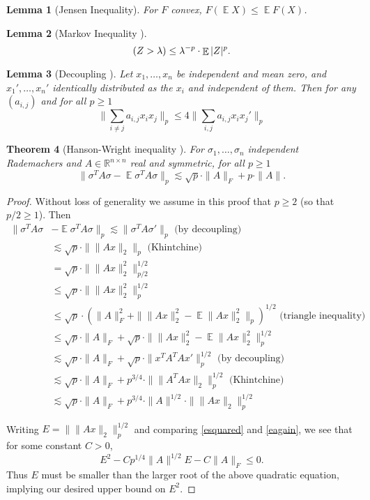 \documentclass[11pt]{article}
\DeclareMathOperator*{\E}{\mathbb{E}}
\let\Pr\relax
\DeclareMathOperator*{\Pr}{\mathbb{P}}
\newcommand{\R}{\mathbb{R}}
\newtheorem{theorem}{Theorem}
\newtheorem{lemma}[theorem]{Lemma}
\begin{document}
\begin{lemma}[Jensen Inequality]
For $F$ convex, $F(\E X) \le \E F(X)$.
\end{lemma}



\begin{lemma}[Markov Inequality ]
$$
\Pr(Z > \lambda) \le \lambda^{-p} \cdot \E|Z|^p.
$$
\end{lemma}



\begin{lemma}[Decoupling {\cite{de2012decoupling}}]
Let $x_1,\ldots,x_n$ be independent and mean zero, and $x_1',\ldots,x_n'$ identically distributed as the $x_i$ and independent of them. Then for any $(a_{i,j})$ and for all $p\ge 1$
$$
\|\sum_{i\neq j} a_{i,j} x_i x_j\|_p \le 4 \|\sum_{i,j} a_{i ,j} x_i x_j'\|_p
$$
\end{lemma}


\begin{theorem}[Hanson-Wright inequality ]\label{hw}
For $\sigma_1,\ldots,\sigma_n$ independent Rademachers and $A\in\R^{n\times n}$ real and symmetric, for all $p\ge 1$
$$
\|\sigma^T A \sigma - \E \sigma^T A \sigma\|_p \lesssim \sqrt{p} \cdot \|A\|_F + p\cdot \|A\| .
$$
\end{theorem}
\begin{proof}
Without loss of generality we assume in this proof that $p\ge 2$ (so that $p/2 \ge 1$). Then
\begin{align}
\|\sigma^T A \sigma &- \E \sigma^T A \sigma\|_p \lesssim \|\sigma^T A \sigma'\|_p\text{ (by decoupling)} \label{hwstart}\\
{}&\lesssim \sqrt{p} \cdot \| \|Ax\|_2 \|_p \text{ (Khintchine)} \label{esquared}\\
{}& = \sqrt{p} \cdot \| \|Ax\|_2^2 \|_{p/2}^{1/2} \label{induction}\\
\nonumber {}& \le \sqrt{p} \cdot \| \|Ax\|_2^2 \|_p^{1/2} \\
\nonumber {}& \le \sqrt{p} \cdot (\|A\|_F^2 + \|\|Ax\|_2^2 - \E \|Ax\|_2^2 \|_p)^{1/2} \text{ (triangle inequality)}\\
\nonumber {}& \le \sqrt{p} \cdot \|A\|_F + \sqrt{p}\cdot \|\|Ax\|_2^2 - \E \|Ax\|_2^2 \|_p^{1/2}\\
\nonumber {}& \lesssim \sqrt{p} \cdot \|A\|_F + \sqrt{p}\cdot \|x^T A^T A x'\|_p^{1/2}\text{ (by decoupling)}\\
\nonumber {}& \lesssim \sqrt{p} \cdot \|A\|_F + p^{3/4}\cdot \|\|A^T Ax\|_2\|_p^{1/2}\text{ (Khintchine)}\\
{}& \lesssim \sqrt{p} \cdot \|A\|_F + p^{3/4}\cdot\|A\|^{1/2} \cdot\|\|Ax\|_2\|_p^{1/2} \label{eagain}
\end{align}

Writing $E = \|\|Ax\|_2\|_p^{1/2}$ and comparing \ref{esquared} and \ref{eagain}, we see that for some constant $C > 0$,
$$
E^2 - Cp^{1/4}\|A\|^{1/2} E - C\|A\|_F \le 0 .
$$
Thus $E$ must be smaller than the larger root of the above quadratic equation, implying our desired upper bound on $E^2$.
\end{proof}
\end{document}

